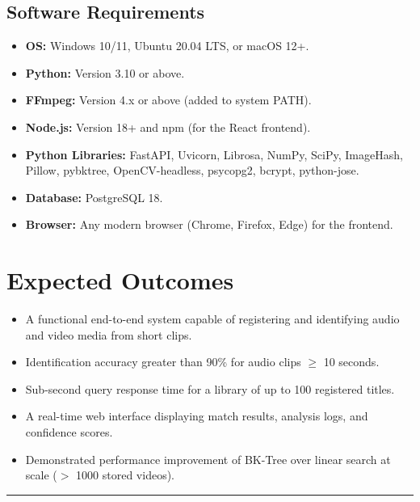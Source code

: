 \subsection*{Software Requirements}
\begin{itemize}
  \item \textbf{OS:} Windows 10/11, Ubuntu 20.04 LTS, or macOS 12+.
  \item \textbf{Python:} Version 3.10 or above.
  \item \textbf{FFmpeg:} Version 4.x or above (added to system PATH).
  \item \textbf{Node.js:} Version 18+ and npm (for the React frontend).
  \item \textbf{Python Libraries:} FastAPI, Uvicorn, Librosa, NumPy, SciPy, ImageHash, Pillow, pybktree, OpenCV-headless, psycopg2, bcrypt, python-jose.
  \item \textbf{Database:} PostgreSQL 18.
  \item \textbf{Browser:} Any modern browser (Chrome, Firefox, Edge) for the frontend.
\end{itemize}

\section{Expected Outcomes}
\begin{itemize}
  \item A functional end-to-end system capable of registering and identifying audio and video media from short clips.
  \item Identification accuracy greater than 90\% for audio clips $\geq$ 10 seconds.
  \item Sub-second query response time for a library of up to 100 registered titles.
  \item A real-time web interface displaying match results, analysis logs, and confidence scores.
  \item Demonstrated performance improvement of BK-Tree over linear search at scale ($>$ 1000 stored videos).
\end{itemize}

\vspace{10mm}
\hrule